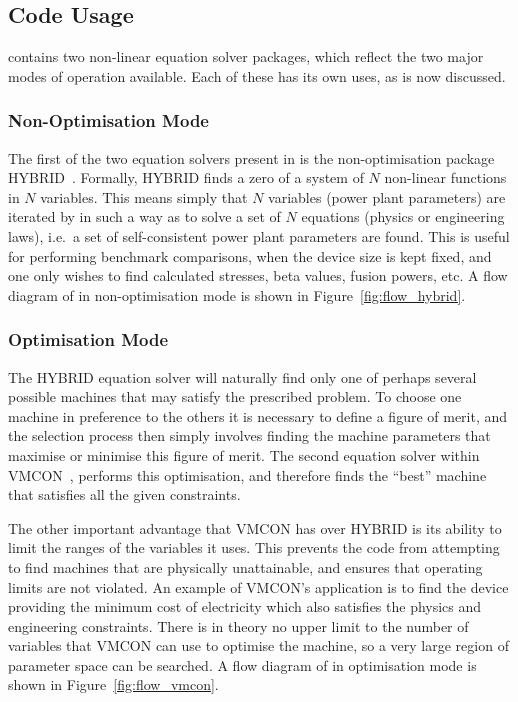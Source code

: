 {\subsection{Code Usage}

\PS contains two non-linear equation solver packages, which reflect the two
major modes of operation available. Each of these has its own uses, as is now
discussed.

\subsubsection{Non-Optimisation Mode}

The first of the two equation solvers present in \PS is the non-optimisation
package HYBRID~\cite{hybrid_anl,hybrid}. Formally, HYBRID finds a zero of a
system of $N$ non-linear functions in $N$ variables. This means simply that
$N$ variables (power plant parameters) are iterated by \PS in such a way as to
solve a set of $N$ equations (physics or engineering laws), i.e.\ a set of
self-consistent power plant parameters are found. This is useful for
performing benchmark comparisons, when the device size is kept fixed, and one
only wishes to find calculated stresses, beta values, fusion powers, etc. A
flow diagram of \PS in non-optimisation mode is shown in
Figure~\ref{fig:flow_hybrid}.


\subsubsection{Optimisation Mode}

The HYBRID equation solver will naturally find only one of perhaps several
possible machines that may satisfy the prescribed problem. To choose one
machine in preference to the others it is necessary to define a figure of
merit, and the selection process then simply involves finding the machine
parameters that maximise or minimise this figure of merit. The second equation
solver within \PSC VMCON~\cite{vmcon}, performs this optimisation, and
therefore finds the ``best'' machine that satisfies all the given constraints.

The other important advantage that VMCON has over HYBRID is its ability to
limit the ranges of the variables it uses. This prevents the code from
attempting to find machines that are physically unattainable, and ensures that
operating limits are not violated. An example of VMCON's application is to
find the device providing the minimum cost of electricity which also satisfies
the physics and engineering constraints. There is in theory no upper limit to
the number of variables that VMCON can use to optimise the machine, so a very
large region of parameter space can be searched. A flow diagram of \PS in
optimisation mode is shown in Figure~\ref{fig:flow_vmcon}.

}
